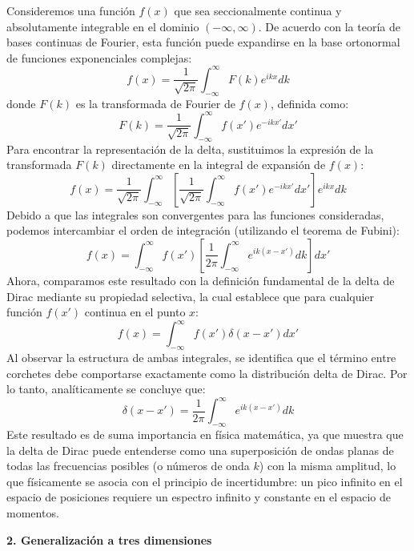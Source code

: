 \documentclass[a4paper]{article}
\begin{document}
Consideremos una función $f(x)$ que sea seccionalmente continua y absolutamente integrable en el dominio $(-\infty, \infty)$. De acuerdo con la teoría de bases continuas de Fourier, esta función puede expandirse en la base ortonormal de funciones exponenciales complejas:
$$ f(x) = \frac{1}{\sqrt{2\pi}} \int_{-\infty}^{\infty} F(k) e^{ikx} dk $$
donde $F(k)$ es la transformada de Fourier de $f(x)$, definida como:
$$ F(k) = \frac{1}{\sqrt{2\pi}} \int_{-\infty}^{\infty} f(x') e^{-ikx'} dx' $$
Para encontrar la representación de la delta, sustituimos la expresión de la transformada $F(k)$ directamente en la integral de expansión de $f(x)$:
$$ f(x) = \frac{1}{\sqrt{2\pi}} \int_{-\infty}^{\infty} \left[ \frac{1}{\sqrt{2\pi}} \int_{-\infty}^{\infty} f(x') e^{-ikx'} dx' \right] e^{ikx} dk $$
Debido a que las integrales son convergentes para las funciones consideradas, podemos intercambiar el orden de integración (utilizando el teorema de Fubini):
$$ f(x) = \int_{-\infty}^{\infty} f(x') \left[ \frac{1}{2\pi} \int_{-\infty}^{\infty} e^{ik(x-x')} dk \right] dx' $$
Ahora, comparamos este resultado con la definición fundamental de la delta de Dirac mediante su propiedad selectiva, la cual establece que para cualquier función $f(x')$ continua en el punto $x$:
$$ f(x) = \int_{-\infty}^{\infty} f(x') \delta(x - x') dx' $$
Al observar la estructura de ambas integrales, se identifica que el término entre corchetes debe comportarse exactamente como la distribución delta de Dirac. Por lo tanto, analíticamente se concluye que:
$$ \delta(x - x') = \frac{1}{2\pi} \int_{-\infty}^{\infty} e^{ik(x-x')} dk $$
Este resultado es de suma importancia en física matemática, ya que muestra que la delta de Dirac puede entenderse como una superposición de ondas planas de todas las frecuencias posibles (o números de onda $k$) con la misma amplitud, lo que físicamente se asocia con el principio de incertidumbre: un pico infinito en el espacio de posiciones requiere un espectro infinito y constante en el espacio de momentos.

\textbf{2. Generalización a tres dimensiones}
\end{document}
